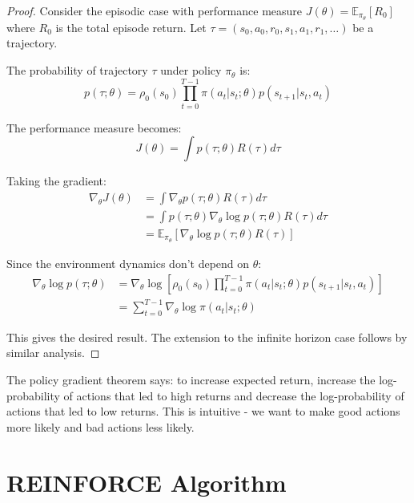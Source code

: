 \begin{proof}
Consider the episodic case with performance measure $J(\theta) = \mathbb{E}_{\pi_\theta}[R_0]$ where $R_0$ is the total episode return. Let $\tau = (s_0, a_0, r_0, s_1, a_1, r_1, \ldots)$ be a trajectory.

The probability of trajectory $\tau$ under policy $\pi_\theta$ is:
\begin{equation}
p(\tau; \theta) = \rho_0(s_0) \prod_{t=0}^{T-1} \pi(a_t|s_t; \theta) p(s_{t+1}|s_t, a_t)
\end{equation}

The performance measure becomes:
\begin{equation}
J(\theta) = \int p(\tau; \theta) R(\tau) d\tau
\end{equation}

Taking the gradient:
\begin{align}
\nabla_\theta J(\theta) &= \int \nabla_\theta p(\tau; \theta) R(\tau) d\tau \\
&= \int p(\tau; \theta) \nabla_\theta \log p(\tau; \theta) R(\tau) d\tau \\
&= \mathbb{E}_{\pi_\theta} \left[ \nabla_\theta \log p(\tau; \theta) R(\tau) \right]
\end{align}

Since the environment dynamics don't depend on $\theta$:
\begin{align}
\nabla_\theta \log p(\tau; \theta) &= \nabla_\theta \log \left[ \rho_0(s_0) \prod_{t=0}^{T-1} \pi(a_t|s_t; \theta) p(s_{t+1}|s_t, a_t) \right] \\
&= \sum_{t=0}^{T-1} \nabla_\theta \log \pi(a_t|s_t; \theta)
\end{align}

This gives the desired result. The extension to the infinite horizon case follows by similar analysis.
\end{proof}

\begin{remarkbox}
The policy gradient theorem says: to increase expected return, increase the log-probability of actions that led to high returns and decrease the log-probability of actions that led to low returns. This is intuitive - we want to make good actions more likely and bad actions less likely.
\end{remarkbox}

\section{REINFORCE Algorithm}

